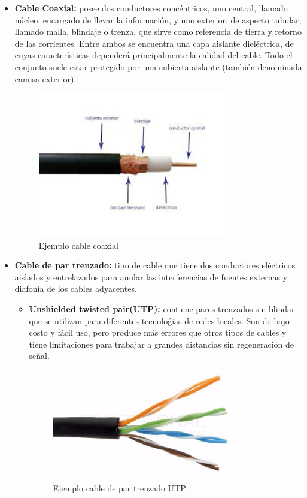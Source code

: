 \documentclass[a4paper,11pt]{article}
\begin{document}
\begin{itemize}
\item \textbf{Cable Coaxial:} posee dos conductores concéntricos, uno central, llamado núcleo, encargado de llevar la información, y uno exterior, de aspecto tubular, llamado malla, blindaje o trenza, que sirve como referencia de tierra y retorno de las corrientes. Entre ambos se encuentra una capa aislante dieléctrica, de cuyas características dependerá principalmente la calidad del cable. Todo el conjunto suele estar protegido por una cubierta aislante (también denominada camisa exterior).

\begin{figure}[h]
\centering
\caption{Ejemplo cable coaxial}
\includegraphics[scale=1,width=0.8\textwidth]{cable_coaxial.jpeg}
\end{figure}

\item \textbf{Cable de par trenzado:} tipo de cable que tiene dos conductores eléctricos aislados y entrelazados para anular las interferencias de fuentes externas y diafonía de los cables adyacentes. 
	\begin{itemize}
		\item \textbf{Unshielded twisted pair(UTP):} contiene pares trenzados sin blindar que se utilizan para diferentes tecnoloǵias de redes locales. Son de bajo costo y fácil uso, pero produce más errores que otros tipos de cables y tiene limitaciones para trabajar a grandes distancias sin regeneración de señal.
		
		\begin{figure}[h]
		\centering
		\caption{Ejemplo cable de par trenzado UTP}
		\includegraphics[scale=1,width=0.8\textwidth]{ejemplo_cable_utp.jpg}
		\end{figure}
		

\end{itemize}
\end{itemize}
\end{document}

